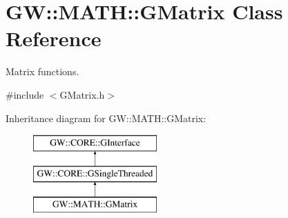 \hypertarget{class_g_w_1_1_m_a_t_h_1_1_g_matrix}{}\section{GW\+:\+:M\+A\+TH\+:\+:G\+Matrix Class Reference}
\label{class_g_w_1_1_m_a_t_h_1_1_g_matrix}


Matrix functions.  




{\ttfamily \#include $<$G\+Matrix.\+h$>$}

Inheritance diagram for GW\+:\+:M\+A\+TH\+:\+:G\+Matrix\+:\begin{figure}[H]
\begin{center}
\leavevmode
\includegraphics[height=3.000000cm]{class_g_w_1_1_m_a_t_h_1_1_g_matrix}
\end{center}
\end{figure}
